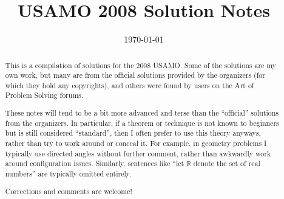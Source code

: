 \documentclass[11pt]{scrartcl}
\title{USAMO 2008 Solution Notes}
\date{\today}
\begin{document}
\maketitle

\begin{abstract}
This is a compilation of solutions
for the 2008 USAMO.
Some of the solutions are my own work,
but many are from the official solutions provided by the organizers
(for which they hold any copyrights),
and others were found by users on the Art of Problem Solving forums.

These notes will tend to be a bit more advanced and terse than the ``official''
solutions from the organizers.
In particular, if a theorem or technique is not known to beginners
but is still considered ``standard'', then I often prefer to
use this theory anyways, rather than try to work around or conceal it.
For example, in geometry problems I typically use directed angles
without further comment, rather than awkwardly work around configuration issues.
Similarly, sentences like ``let $\mathbb{R}$ denote the set of real numbers''
are typically omitted entirely.

Corrections and comments are welcome!
\end{abstract}

\tableofcontents
\newpage

\addtocounter{section}{-1}
\end{document}
